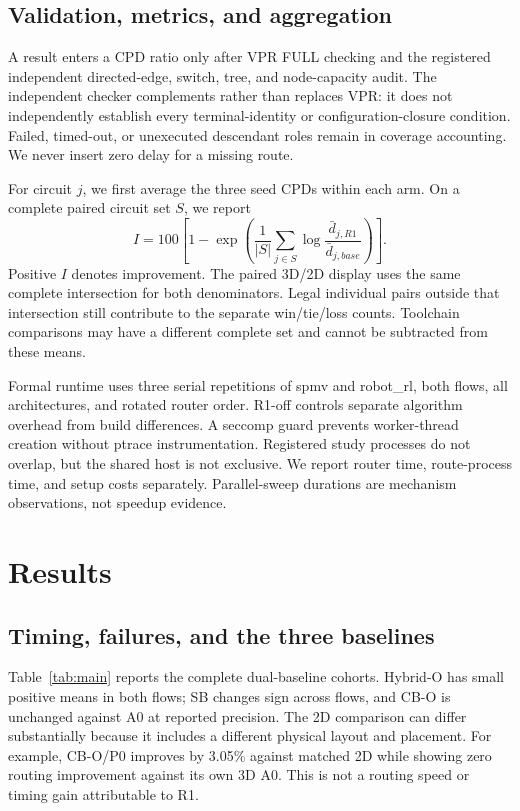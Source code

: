 \documentclass[conference,10pt]{IEEEtran}
\begin{document}
\subsection{Validation, metrics, and aggregation}
A result enters a CPD ratio only after VPR FULL checking and the registered independent directed-edge, switch, tree, and node-capacity audit. The independent checker complements rather than replaces VPR: it does not independently establish every terminal-identity or configuration-closure condition. Failed, timed-out, or unexecuted descendant roles remain in coverage accounting. We never insert zero delay for a missing route.

For circuit $j$, we first average the three seed CPDs within each arm. On a complete paired circuit set $S$, we report
\begin{equation}
 I=100\left[1-\exp\left(\frac{1}{|S|}\sum_{j\in S}\log\frac{\bar d_{j,R1}}{\bar d_{j,base}}\right)\right].
\end{equation}
Positive $I$ denotes improvement. The paired 3D/2D display uses the same complete intersection for both denominators. Legal individual pairs outside that intersection still contribute to the separate win/tie/loss counts. Toolchain comparisons may have a different complete set and cannot be subtracted from these means.

Formal runtime uses three serial repetitions of spmv and robot\_rl, both flows, all architectures, and rotated router order. R1-off controls separate algorithm overhead from build differences. A seccomp guard prevents worker-thread creation without ptrace instrumentation. Registered study processes do not overlap, but the shared host is not exclusive. We report router time, route-process time, and setup costs separately. Parallel-sweep durations are mechanism observations, not speedup evidence.

\clearpage
\section{Results}
\subsection{Timing, failures, and the three baselines}
Table~\ref{tab:main} reports the complete dual-baseline cohorts. Hybrid-O has small positive means in both flows; SB changes sign across flows, and CB-O is unchanged against A0 at reported precision. The 2D comparison can differ substantially because it includes a different physical layout and placement. For example, CB-O/P0 improves by 3.05\% against matched 2D while showing zero routing improvement against its own 3D A0. This is not a routing speed or timing gain attributable to R1.
\end{document}
